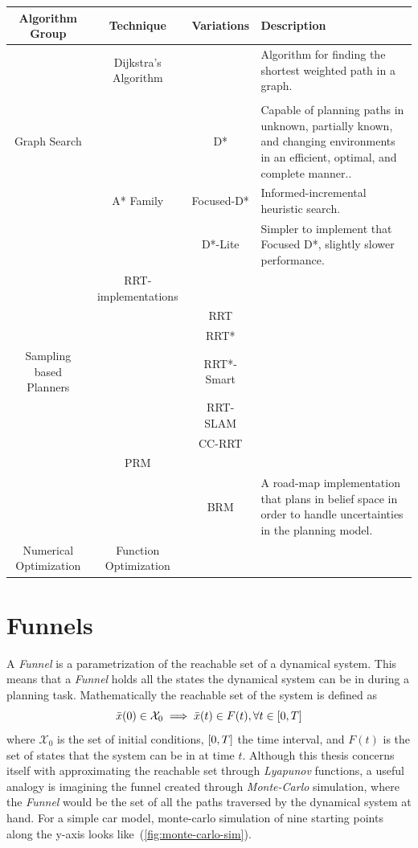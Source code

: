 \begin{table}
  \begin{tabular}{c c c p{4cm}}
    \hline
    \hline
    Algorithm Group & Technique & Variations & Description \\
    \hline
                    &  Dijkstra's Algorithm & &Algorithm for finding the shortest weighted path in a graph.\\
                    &  \\
    Graph Search               & & D* & Capable of planning paths in unknown, partially known, and changing environments in an efficient, optimal, and complete manner..\\
                    & A* Family & Focused-D* & Informed-incremental heuristic search.\\
                    & & D*-Lite & Simpler to implement that Focused D*, slightly slower performance.\\
    \hline
                    & RRT-implementations \\
                    & & RRT\\
                    & & RRT*\\
    Sampling based Planners& & RRT*-Smart\\
                    & & RRT-SLAM\\
                    & & CC-RRT\\
                    & PRM \\
                    & & BRM & A road-map implementation that plans in belief space in order to handle uncertainties in the planning model.\\
    \hline
    Numerical Optimization &  Function Optimization \\
    \hline
  \end{tabular} 
\end{table}

\section{Funnels}

A \textit{Funnel} is a parametrization of the reachable set of a dynamical
system. This means that a \textit{Funnel} holds all the states the dynamical
system can be in during a planning task. Mathematically the reachable set of the
system is defined as
\[
  \bar{x}(0) \in \mathcal{X}_0 \implies \bar{x}(t) \in F(t), \forall t \in
  \lbrack0,T\rbrack
\]
where \(\mathcal{X}_0\) is the set of initial conditions, \(\lbrack0,T\rbrack\) the time
interval, and \(F(t)\) is the set of states that the system can be in at time
\(t\). Although this thesis concerns itself with approximating the reachable set
through \textit{Lyapunov} functions, a useful analogy is imagining the funnel
created through \textit{Monte-Carlo} simulation, where the \textit{Funnel} would
be the set of all the paths traversed by the dynamical system at hand. For a
simple car model, monte-carlo simulation of nine starting points along the
y-axis looks like~(\ref{fig:monte-carlo-sim}).

